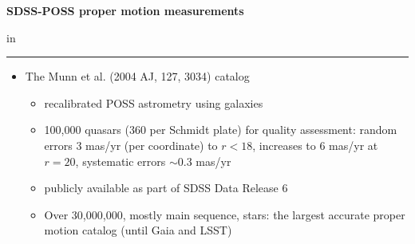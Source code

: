 \documentclass[letterpaper,landscape]{slides}
\begin{document}
\begin{slide}
\begin{center}
\bfseries
{\color{red} \large SDSS-POSS proper motion measurements}
\end{center}
 in
\hrule

\begin{itemize}
\item
{\color{blue} The Munn et al. (2004 AJ, 127, 3034) catalog}
   \begin{itemize}
   \item recalibrated POSS astrometry using galaxies
   \item 100,000 quasars (360 per Schmidt plate) for quality 
         assessment: random errors
         3 mas/yr (per coordinate) to $r<18$, increases to 6 mas/yr 
         at $r=20$, systematic errors $\sim$0.3 mas/yr
   \item publicly available as part of SDSS Data Release 6
   \item Over 30,000,000, mostly main sequence, stars: the largest
         accurate proper motion catalog (until Gaia and LSST)
   \end{itemize}

\end{itemize}
\end{slide}


\end{document}
